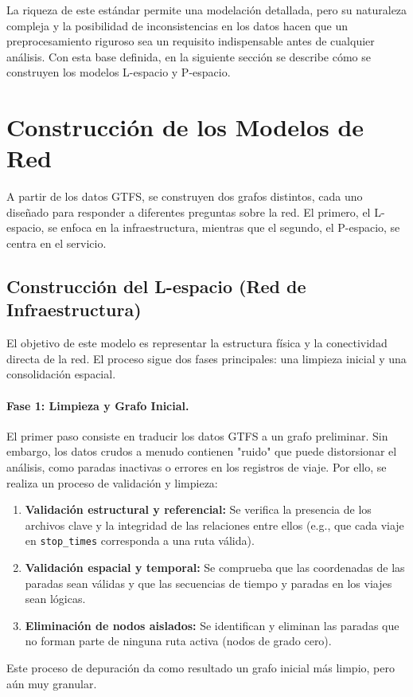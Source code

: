         La riqueza de este estándar permite una modelación detallada, pero su naturaleza compleja y la posibilidad de inconsistencias en los datos hacen que un preprocesamiento riguroso sea un requisito indispensable antes de cualquier análisis. Con esta base definida, en la siguiente sección se describe cómo se construyen los modelos L-espacio y P-espacio.
        
    \section{Construcción de los Modelos de Red}
    
        A partir de los datos GTFS, se construyen dos grafos distintos, cada uno diseñado para responder a diferentes preguntas sobre la red. El primero, el L-espacio, se enfoca en la infraestructura, mientras que el segundo, el P-espacio, se centra en el servicio.
        
        \subsection{Construcción del L-espacio (Red de Infraestructura)}
        
            El objetivo de este modelo es representar la estructura física y la conectividad directa de la red. El proceso sigue dos fases principales: una limpieza inicial y una consolidación espacial.

            \paragraph{Fase 1: Limpieza y Grafo Inicial.}
            El primer paso consiste en traducir los datos GTFS a un grafo preliminar. Sin embargo, los datos crudos a menudo contienen "ruido" que puede distorsionar el análisis, como paradas inactivas o errores en los registros de viaje. Por ello, se realiza un proceso de validación y limpieza:
            \begin{enumerate}
                \item \textbf{Validación estructural y referencial:} Se verifica la presencia de los archivos clave y la integridad de las relaciones entre ellos (e.g., que cada viaje en \texttt{stop\_times} corresponda a una ruta válida).
                \item \textbf{Validación espacial y temporal:} Se comprueba que las coordenadas de las paradas sean válidas y que las secuencias de tiempo y paradas en los viajes sean lógicas.
                \item \textbf{Eliminación de nodos aislados:} Se identifican y eliminan las paradas que no forman parte de ninguna ruta activa (nodos de grado cero).
            \end{enumerate}
            Este proceso de depuración da como resultado un grafo inicial más limpio, pero aún muy granular.

